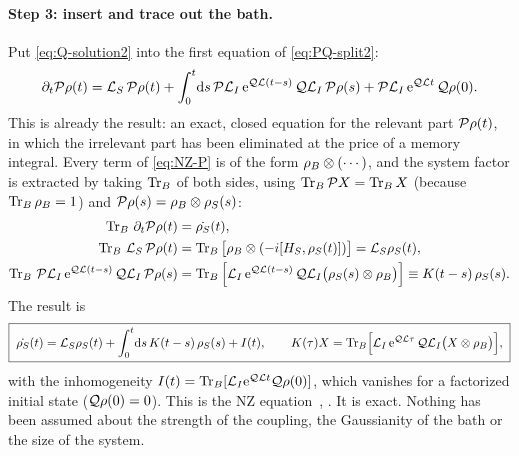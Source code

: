\paragraph{Step 3: insert and trace out the bath.}
Put \cref{eq:Q-solution2} into the first equation of \eqref{eq:PQ-split2}:
\begin{equation}
  \partial_t\mathcal{P}\rho(t)=\mathcal{L}_S\,\mathcal{P}\rho(t)+\int_0^t\!\mathrm{d} s\,\mathcal{P}\mathcal{L}_I\,\mathrm{e}^{\mathcal{Q}\mathcal{L}(t-s)}\,\mathcal{Q}\mathcal{L}_I\,\mathcal{P}\rho(s)+\mathcal{P}\mathcal{L}_I\,\mathrm{e}^{\mathcal{Q}\mathcal{L} t}\,\mathcal{Q}\rho(0).
  \label{eq:NZ-P}
\end{equation}
This is already the result: an exact, closed equation for the relevant part $\mathcal{P}\rho(t)$, in which the irrelevant part has been eliminated at the price of a memory integral.
Every term of \cref{eq:NZ-P} is of the form $\rho_{B}\otimes(\cdots)$, and the system factor is extracted by taking $\operatorname{Tr}_B$ of both sides, using $\operatorname{Tr}_B\mathcal{P} X=\operatorname{Tr}_BX$ (because $\operatorname{Tr}_B\rho_{B}=1$) and $\mathcal{P}\rho(s)=\rho_{B}\otimes\rho_{S}(s)$:
\begin{align*}
  \operatorname{Tr}_B\,\partial_t\mathcal{P}\rho(t)&=\dot{\rho_{S}}(t),\\
  \operatorname{Tr}_B\,\mathcal{L}_S\,\mathcal{P}\rho(t)&=\operatorname{Tr}_B\big[\rho_{B}\otimes(-i[H_S,\rho_{S}(t)])\big]=\mathcal{L}_S\rho_{S}(t),\\
  \operatorname{Tr}_B\,\mathcal{P}\mathcal{L}_I\,\mathrm{e}^{\mathcal{Q}\mathcal{L}(t-s)}\,\mathcal{Q}\mathcal{L}_I\,\mathcal{P}\rho(s)&=\operatorname{Tr}_B\Big[\mathcal{L}_I\,\mathrm{e}^{\mathcal{Q}\mathcal{L}(t-s)}\,\mathcal{Q}\mathcal{L}_I\big(\rho_{S}(s)\otimes\rho_{B}\big)\Big]\equiv K(t-s)\,\rho_{S}(s).
\end{align*}
The result is
\begin{equation}
  \boxed{\;\dot{\rho_{S}}(t)=\mathcal{L}_S\rho_{S}(t)+\int_0^t\!\mathrm{d} s\,K(t-s)\,\rho_{S}(s)+I(t),\qquad
  K(\tau)X=\operatorname{Tr}_B\!\Big[\mathcal{L}_I\,\mathrm{e}^{\mathcal{Q}\mathcal{L}\tau}\,\mathcal{Q}\mathcal{L}_I\big(X\otimes\rho_{B}\big)\Big],\;}
  \label{eq:NZ}
\end{equation}
with the inhomogeneity $I(t)=\operatorname{Tr}_B[\mathcal{L}_I\mathrm{e}^{\mathcal{Q}\mathcal{L} t}\mathcal{Q}\rho(0)]$, which vanishes for a factorized initial state ($\mathcal{Q}\rho(0)=0$).
This is the NZ equation~\cite[Sec.~9.1]{BreuerPetruccione}, \cite[Ch.~8]{ZwanzigBook}.
It is exact.
Nothing has been assumed about the strength of the coupling, the Gaussianity of the bath or the size of the system.

